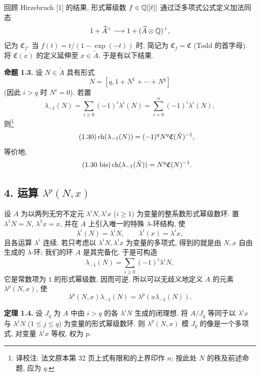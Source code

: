 回顾 Hirzebruch [1] 的结果, 形式幂级数 $f\in\mathbb Q[[t]]$ 通过泛多项式公式定义加法同态
\[
1+\widehat A^{+}\longrightarrow 1+(\widehat A\otimes\mathbb Q)^+,
\]
记为 $\mathfrak C_f$. 当 $f(t)=t/(1-\exp(-t))$ 时, 简记为 $\mathfrak C_f=\mathfrak C$ (Todd 的首字母). 将 $\mathfrak C(x)$ 的定义延伸至 $x\in\widetilde A$. 于是有以下结果.

\textbf{命题 1.3.} 设 $N\in\widetilde A$ 具有形式
\[
N=[q,1+N^1+\cdots+N^q]
\]
(因此 $i>q$ 时 $N^i=0$). 若置
\[
\lambda_{-1}(N)=\sum_{i\geq 0}(-1)^i\lambda^i(N)=\sum_{i=0}^{n}(-1)^i\lambda^i(N),
\]
则\footnote{译校注: 法文原本第 32 页上式有限和的上界印作 $n$; 按此处 $N$ 的秩及前述命题, 应为 $q$.}
\begin{equation}\tag{1.30}
\operatorname{ch}(\lambda_{-1}(N))=(-1)^qN^q\mathfrak C(\check N)^{-1},
\end{equation}
等价地,
\begin{equation}\tag{1.30 bis}
\operatorname{ch}(\lambda_{-1}(\check N))=N^q\mathfrak C(N)^{-1}.
\end{equation}

\subsection*{4. 运算 $\lambda^p(N,x)$}

设 $A$ 为以两列无穷不定元 $\lambda^iN,\lambda^i x$ ($i\geq1$) 为变量的整系数形式幂级数环. 置 $\lambda^1N=N$, $\lambda^1x=x$, 并在 $A$ 上引入唯一的特殊 $\lambda$-环结构, 使
\[
\lambda^i(N)=\lambda^iN,
\qquad
\lambda^i(x)=\lambda^i x,
\]
且各运算 $\lambda^i$ 连续. 若只考虑以 $\lambda^iN,\lambda^i x$ 为变量的多项式, 得到的就是由 $N,x$ 自由生成的 $\lambda$-环; 我们的环 $A$ 是其完备化. 于是可构造
\begin{equation}\tag{1.31}
\lambda_{-1}(N)=\sum_{i\geq 0}(-1)^i\lambda^iN,
\end{equation}
它是常数项为 $1$ 的形式幂级数, 因而可逆. 所以可以无歧义地定义 $A$ 的元素 $\lambda^p(N,x)$, 使
\begin{equation}\tag{1.32}
\lambda^p(N,x)\lambda_{-1}(N)=\lambda^p(x\lambda_{-1}(N)).
\end{equation}

\textbf{定理 1.4.} 设 $J_q$ 为 $A$ 中由 $i>q$ 的各 $\lambda^iN$ 生成的闭理想. 将 $A/J_q$ 等同于以 $\lambda^i x$ 与 $\lambda^jN$ ($1\leq j\leq q$) 为变量的形式幂级数环. 则 $\lambda^p(N,x)$ 模 $J_q$ 的像是一个多项式, 对变量 $\lambda^i x$ 等权, 权为 $p$.

